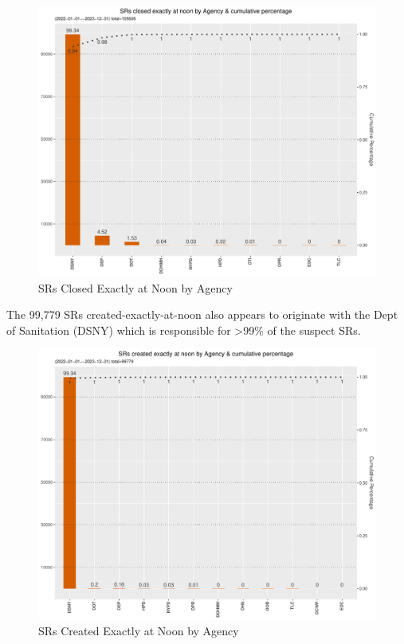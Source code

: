 \documentclass[12pt, titlepage]{article}
\begin{document}
	\begin{figure}[tbp]
		\centering
		\includegraphics[width = \textwidth]
		{closed_at_noon_chart.pdf}
		\caption{SRs Closed Exactly at Noon by Agency}
		\label{fig:noon-closed}
	\end{figure}	
	
	The 99,779 SRs created-exactly-at-noon also appears to 
	originate with the Dept of Sanitation (DSNY) which is responsible 
	for \textgreater99\% of the suspect SRs.
	
	\begin{figure}[tbp]
		\centering
		\includegraphics[width = \textwidth]{created_at_noon_chart.pdf}
		\caption{SRs Created Exactly at Noon by Agency}
		\label{fig:noon-created}
	\end{figure}		
		
\end{document}
